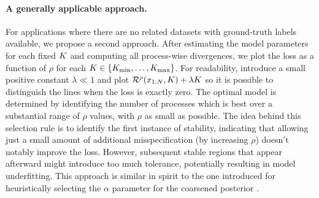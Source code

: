 \paragraph{A generally applicable approach.}
For applications where there are no related datasets with ground-truth labels available, we
propose a second approach.  %
After estimating the model parameters for each fixed $K$
and computing all process-wise divergences, we plot the loss as a function of $\rho$ for each $K \in \{K_{\min},\dots,K_{\max}\}$.
For readability, introduce a small positive constant $\lambda \ll 1$ and plot $\mathcal{R}^{\rho}(x_{1:N}, K) + \lambda K$
so it is possible to distinguish the lines when the loss is exactly zero.
The optimal model is determined by identifying the number of processes which is best over a substantial range of $\rho$ values,
with $\rho$ as small as possible.
The idea behind this selection rule is to identify the first instance of stability, indicating that allowing just a small amount of additional misspecification (by increasing $\rho$) doesn't notably improve the loss.
However, subsequent stable regions that appear afterward might introduce too much tolerance, potentially resulting in model underfitting.
This approach is similar in spirit to the one introduced for heuristically selecting the $\alpha$ parameter for the coarsened posterior \citep{Miller:2019}.



